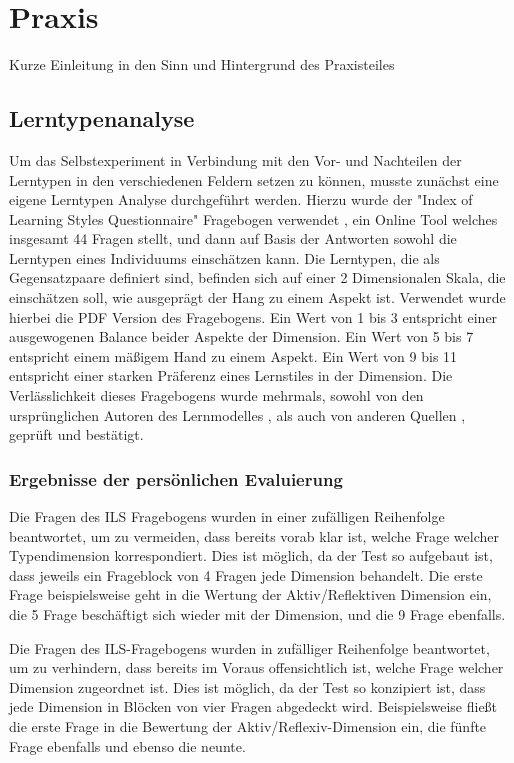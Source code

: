 \clearpage
\section{Praxis}
\label{sec:practice}

Kurze Einleitung in den Sinn und Hintergrund des Praxisteiles

\subsection{Lerntypenanalyse}
Um das Selbstexperiment in Verbindung mit den Vor- und Nachteilen der Lerntypen in den verschiedenen Feldern setzen zu können, musste zunächst eine eigene Lerntypen Analyse durchgeführt werden.
Hierzu wurde der "Index of Learning Styles Questionnaire" Fragebogen verwendet \cite{ils_questionnaire}, ein Online Tool welches insgesamt 44 Fragen stellt, und dann auf Basis der Antworten sowohl die Lerntypen eines Individuums einschätzen kann. Die Lerntypen, die als Gegensatzpaare definiert sind, befinden sich auf einer 2 Dimensionalen Skala, die einschätzen soll, wie ausgeprägt der Hang zu einem Aspekt ist. Verwendet wurde hierbei die PDF Version des Fragebogens. Ein Wert von 1 bis 3 entspricht einer ausgewogenen Balance beider Aspekte der Dimension. Ein Wert von 5 bis 7 entspricht einem mäßigem Hand zu einem Aspekt. Ein Wert von 9 bis 11 entspricht einer starken Präferenz eines Lernstiles in der Dimension.
Die Verlässlichkeit dieses Fragebogens wurde mehrmals, sowohl von den ursprünglichen Autoren des Lernmodelles \cite{felder2005}, als auch von anderen Quellen \cite{zywno}, geprüft und bestätigt.

\subsubsection{Ergebnisse der persönlichen Evaluierung}
Die Fragen des ILS Fragebogens wurden in einer zufälligen Reihenfolge beantwortet, um zu vermeiden, dass bereits vorab klar ist, welche Frage welcher Typendimension korrespondiert. Dies ist möglich, da der Test so aufgebaut ist, dass jeweils ein Frageblock von 4 Fragen jede Dimension behandelt. Die erste Frage beispielsweise geht in die Wertung der Aktiv/Reflektiven Dimension ein, die 5 Frage beschäftigt sich wieder mit der Dimension, und die 9 Frage ebenfalls.

Die Fragen des ILS-Fragebogens wurden in zufälliger Reihenfolge beantwortet, um zu verhindern, dass bereits im Voraus offensichtlich ist, welche Frage welcher Dimension zugeordnet ist.
Dies ist möglich, da der Test so konzipiert ist, dass jede Dimension in Blöcken von vier Fragen abgedeckt wird. Beispielsweise fließt die erste Frage in die Bewertung der Aktiv/Reflexiv-Dimension ein, die fünfte Frage ebenfalls und ebenso die neunte.

